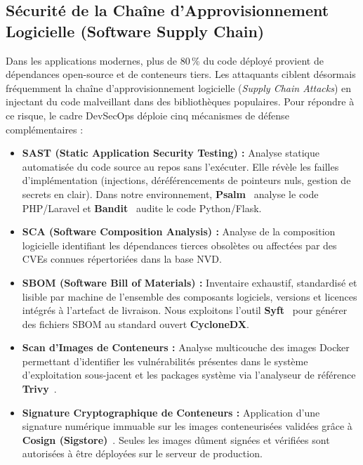 \subsection{S\'ecurit\'e de la Cha\^ine d'Approvisionnement Logicielle (Software Supply Chain)}
\par Dans les applications modernes, plus de 80\,\% du code d\'eploy\'e provient de d\'ependances open-source et de conteneurs tiers. Les attaquants ciblent d\'esormais fr\'equemment la cha\^ine d'approvisionnement logicielle (\textit{Supply Chain Attacks}) en injectant du code malveillant dans des biblioth\`eques populaires. Pour r\'epondre \`a ce risque, le cadre DevSecOps d\'eploie cinq m\'ecanismes de d\'efense compl\'ementaires :
\begin{itemize}
    \item \textbf{SAST (Static Application Security Testing) :} Analyse statique automatis\'ee du code source au repos sans l'ex\'ecuter. Elle r\'ev\`ele les failles d'impl\'ementation (injections, d\'er\'ef\'erencements de pointeurs nuls, gestion de secrets en clair). Dans notre environnement, \textbf{Psalm}~\cite{psalm} analyse le code PHP/Laravel et \textbf{Bandit}~\cite{bandit} audite le code Python/Flask.
    \item \textbf{SCA (Software Composition Analysis) :} Analyse de la composition logicielle identifiant les d\'ependances tierces obsol\`etes ou affect\'ees par des CVEs connues r\'epertori\'ees dans la base NVD.
    \item \textbf{SBOM (Software Bill of Materials) :} Inventaire exhaustif, standardis\'e et lisible par machine de l'ensemble des composants logiciels, versions et licences int\'egr\'es \`a l'artefact de livraison. Nous exploitons l'outil \textbf{Syft}~\cite{syft} pour g\'en\'erer des fichiers SBOM au standard ouvert \textbf{CycloneDX}.
    \item \textbf{Scan d'Images de Conteneurs :} Analyse multicouche des images Docker permettant d'identifier les vuln\'erabilit\'es pr\'esentes dans le syst\`eme d'exploitation sous-jacent et les packages syst\`eme via l'analyseur de r\'ef\'erence \textbf{Trivy}~\cite{trivy}.
    \item \textbf{Signature Cryptographique de Conteneurs :} Application d'une signature num\'erique immuable sur les images conteneuris\'ees valid\'ees gr\^ace \`a \textbf{Cosign (Sigstore)}~\cite{cosign}. Seules les images d\^ument sign\'ees et v\'erifi\'ees sont autoris\'ees \`a \^etre d\'eploy\'ees sur le serveur de production.
\end{itemize}

